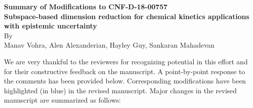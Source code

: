 \documentclass[11pt,final]{article}
\begin{document}
\begin{center}
{\bf Summary of Modifications to CNF-D-18-00757}\\[6pt]
{\bf Subspace-based dimension reduction for chemical kinetics applications with 
epistemic uncertainty}\\[6pt]
By \\
Manav Vohra, Alen Alexanderian, Hayley Guy, Sankaran Mahadevan 
\end{center}



\vspace*{1in}


We are very thankful to the reviewers for recognizing potential in this effort and 
for their constructive feedback on the manuscript. A point-by-point
response to the comments has been provided below. Corresponding modifications have been
highlighted (in blue) in the revised manuscript. Major changes in the revised manuscript
are summarized as follows:
\end{document}
